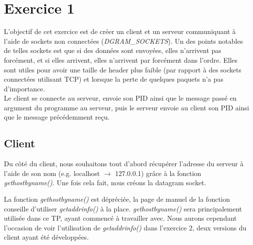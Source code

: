\section{Exercice 1}
L'objectif de cet exercice est de créer un client et un serveur communiquant à l'aide de sockets non connectées (\emph{DGRAM\_SOCKETS}). Un des points notables de telles sockets est que si des données sont envoyées, elles n'arrivent pas forcément, et si elles arrivent, elles n'arrivent par forcément dans l'ordre. Elles sont utiles pour avoir une taille de header plus faible (par rapport à des sockets connectées utilisant TCP) et lorsque la perte de quelques paquets n'a pas d'importance.\\

Le client se connecte au serveur, envoie son PID ainsi que le message passé en argument du programme au serveur, puis le serveur envoie au client son PID ainsi que le message précédemment reçu.

\subsection{Client}
Du côté du client, nous souhaitons tout d'abord récupérer l'adresse du serveur à l'aide de son nom (e.g. localhost $\rightarrow$ 127.0.0.1) grâce à la fonction \emph{gethostbyname()}. Une fois cela fait, nous créons la datagram socket.\\

\begin{mdframed}[backgroundcolor=hintbg, linecolor=hintborder]
La fonction \emph{gethostbyname()} est dépréciée, la page de manuel de la fonction conseille d'utiliser \emph{getaddrinfo()} à la place. \emph{gethostbyname()} sera principalement utilisée dans ce TP, ayant commencé à travailler avec. Nous aurons cependant l'occasion de voir l'utilisation de \emph{getaddrinfo()} dans l'exercice 2, deux versions du client ayant été développées.
\end{mdframed}

